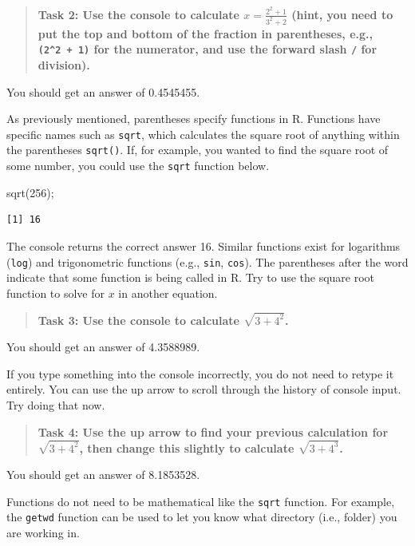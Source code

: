 \documentclass[
]{scrbook}
\newenvironment{Shaded}{\begin{snugshade}}{\end{snugshade}}
\newcommand{\DecValTok}[1]{\textcolor[rgb]{0.00,0.00,0.81}{#1}}
\newcommand{\FunctionTok}[1]{\textcolor[rgb]{0.00,0.00,0.00}{#1}}
\newcommand{\NormalTok}[1]{#1}
\begin{document}
\begin{quote}
\textbf{Task 2: Use the console to calculate \(x = \frac{2^2 + 1}{3^2 + 2}\) (hint, you need to put the top and bottom of the fraction in parentheses, e.g., \texttt{(2\^{}2\ +\ 1)} for the numerator, and use the forward slash \texttt{/} for division).}
\end{quote}

You should get an answer of 0.4545455.

As previously mentioned, parentheses specify functions in R.
Functions have specific names such as \texttt{sqrt}, which calculates the square root of anything within the parentheses \texttt{sqrt()}.
If, for example, you wanted to find the square root of some number, you could use the \texttt{sqrt} function below.

\begin{Shaded}
\begin{Highlighting}[]
\FunctionTok{sqrt}\NormalTok{(}\DecValTok{256}\NormalTok{);}
\end{Highlighting}
\end{Shaded}

\begin{verbatim}
[1] 16
\end{verbatim}

The console returns the correct answer 16.
Similar functions exist for logarithms (\texttt{log}) and trigonometric functions (e.g., \texttt{sin}, \texttt{cos}).
The parentheses after the word indicate that some function is being called in R.
Try to use the square root function to solve for \(x\) in another equation.

\begin{quote}
\textbf{Task 3: Use the console to calculate \(\sqrt{3 + 4^2}\).}
\end{quote}

You should get an answer of 4.3588989.

If you type something into the console incorrectly, you do not need to retype it entirely.
You can use the up arrow to scroll through the history of console input.
Try doing that now.

\begin{quote}
\textbf{Task 4: Use the up arrow to find your previous calculation for \(\sqrt{3 + 4^2}\), then change this slightly to calculate \(\sqrt{3 + 4^3}\).}
\end{quote}

You should get an answer of 8.1853528.

Functions do not need to be mathematical like the \texttt{sqrt} function.
For example, the \texttt{getwd} function can be used to let you know what directory (i.e., folder) you are working in.
\end{document}
